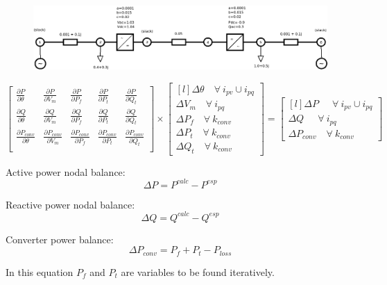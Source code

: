 \documentclass[11pt,a4paper]{report}
\begin{document}
\begin{figure}
	\centering
	\includegraphics[width=0.99\linewidth]{acdc_6bus_diagram}
	\caption{}
	\label{fig:acdc6busdiagram}
\end{figure}

\begin{equation}
	\begin{bmatrix}
		\frac{\partial P}{\partial \theta} & \frac{\partial P}{\partial V_m} & \frac{\partial P}{\partial P_f} & \frac{\partial P}{\partial P_t} & \frac{\partial P}{\partial Q_t}\\
		\frac{\partial Q}{\partial \theta} & \frac{\partial Q}{\partial V_m} & \frac{\partial Q}{\partial P_f} & \frac{\partial Q}{\partial P_t} & \frac{\partial Q}{\partial Q_t}\\
		\frac{\partial P_{conv}}{\partial \theta} & \frac{\partial P_{conv}}{\partial V_m} & \frac{\partial P_{conv}}{\partial P_f} & \frac{\partial P_{conv}}{\partial P_t} & \frac{\partial P_{conv}}{\partial Q_t}\\
	\end{bmatrix}	
	\times 
	\begin{bmatrix*}[l]
		\Delta \theta  \quad \forall \ i_{pv} \cup i_{pq}   \\
		\Delta V_m     \quad \forall \ i_{pq}  \\
		\Delta P_f     \quad \forall \ k_{conv} \\
		\Delta P_t     \quad \forall \ k_{conv} \\
		\Delta Q_t     \quad \forall \ k_{conv}
	\end{bmatrix*}
	= 
	\begin{bmatrix*}[l]
		\Delta P \quad \ \ \forall \ i_{pv} \cup i_{pq} \\
		\Delta Q \quad \ \ \forall \ i_{pq}  \\
		\Delta P_{conv} \quad \forall \ k_{conv} 
	\end{bmatrix*}
\end{equation}


Active power nodal balance:
\begin{equation}
	\Delta P = P^{calc} - P^{esp}
\end{equation}


Reactive power nodal balance:
\begin{equation}
	\Delta Q = Q^{calc} - Q^{esp}
\end{equation}


Converter power balance:
\begin{equation}
	\Delta P_{conv} = P_f + P_t - P_{loss}
\end{equation}

In this equation $P_f$ and $P_t$ are variables to be found iteratively.
\end{document}
